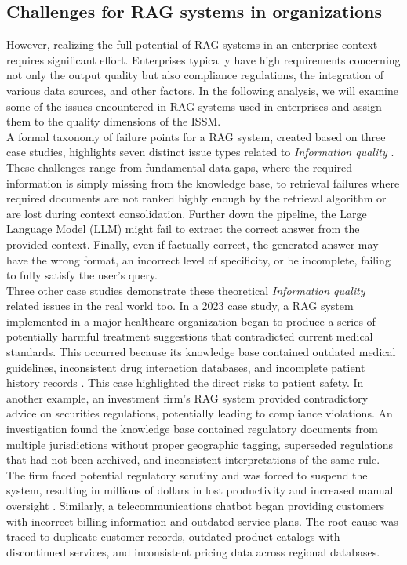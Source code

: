 \documentclass[
	english,
	ruledheaders=section,%
	class=report,%
	thesis={type=bachelor},%
	accentcolor=1b,%
	custommargins=true,%
	marginpar=false,%
	parskip=half-,%
	fontsize=11pt,%
	DIV=14,
]{tudapub}
\begin{document}
\subsection{Challenges for RAG systems in organizations}
However, realizing the full potential of RAG systems in an enterprise context requires significant effort. Enterprises typically have high requirements concerning not only the output quality but also compliance regulations, the integration of various data sources, and other factors. In the following analysis, we will examine some of the issues encountered in RAG systems used in enterprises and assign them to the quality dimensions of the ISSM. \\
A formal taxonomy of failure points for a RAG system, created based on three case studies, highlights seven distinct issue types related to \textit{Information quality} \parencite[p.~91]{Barnett_Kurniawan_Thudumu_Brannelly_Abdelrazek_2024}. These challenges range from fundamental data gaps, where the required information is simply missing from the knowledge base, to retrieval failures where required documents are not ranked highly enough by the retrieval algorithm or are lost during context consolidation. Further down the pipeline, the Large Language Model (LLM) might fail to extract the correct answer from the provided context. Finally, even if factually correct, the generated answer may have the wrong format, an incorrect level of specificity, or be incomplete, failing to fully satisfy the user's query.\\
Three other case studies demonstrate these theoretical \textit{Information quality} related issues in the real world too. In a 2023 case study, a RAG system implemented in a major healthcare organization began to produce a series of potentially harmful treatment suggestions that contradicted current medical standards. This occurred because its knowledge base contained outdated medical guidelines, inconsistent drug interaction databases, and incomplete patient history records \parencite{NStarX_Inc._2025}. This case highlighted the direct risks to patient safety. In another example, an investment firm's RAG system provided contradictory advice on securities regulations, potentially leading to compliance violations. An investigation found the knowledge base contained regulatory documents from multiple jurisdictions without proper geographic tagging, superseded regulations that had not been archived, and inconsistent interpretations of the same rule. The firm faced potential regulatory scrutiny and was forced to suspend the system, resulting in millions of dollars in lost productivity and increased manual oversight \parencite{NStarX_Inc._2025}. Similarly, a telecommunications chatbot began providing customers with incorrect billing information and outdated service plans. The root cause was traced to duplicate customer records, outdated product catalogs with discontinued services, and inconsistent pricing data across regional databases. \parencite{NStarX_Inc._2025}\\
\end{document}
